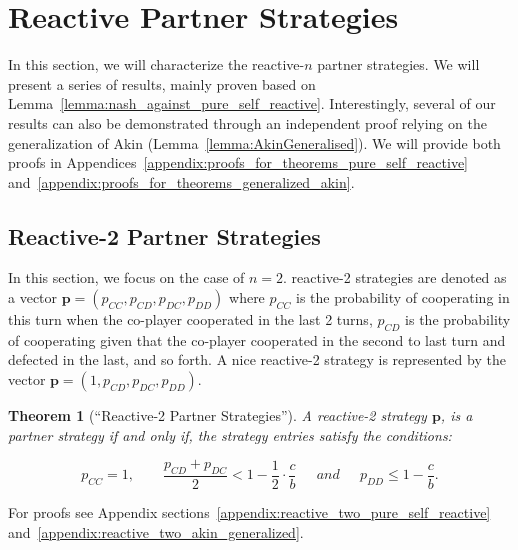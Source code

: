 \documentclass[11pt]{article}
\theoremstyle{plainCl1}
\newtheorem{theorem}{Theorem}
\theoremstyle{plainCl2}
\begin{document}

\section{Reactive Partner Strategies}\label{section:reactive_strategies}

In this section, we will characterize the reactive-$n$ partner strategies. We
will present a series of results, mainly proven based on
Lemma~\ref{lemma:nash_against_pure_self_reactive}. Interestingly, several of our
results can also be demonstrated through an independent proof relying on the
generalization of Akin (Lemma~\ref{lemma:AkinGeneralised}). We will provide both
proofs in Appendices~\ref{appendix:proofs_for_theorems_pure_self_reactive}
and~\ref{appendix:proofs_for_theorems_generalized_akin}.


\subsection{Reactive-2 Partner Strategies}\label{section:reactive_two_partner_strategies}

In this section, we focus on the case of $n=2$. reactive-2 strategies are denoted as a vector
$\mathbf{p}=(p_{CC}, p_{CD}, p_{DC}, p_{DD})$ where $p_{CC}$ is the
probability of cooperating in this turn when the co-player cooperated in the
last 2 turns, $p_{CD}$ is the probability of cooperating given that the
co-player cooperated in the second to last turn and defected in the last, and so
forth. A nice reactive-2 strategy is represented by the vector $\mathbf{p}=(1,
p_{CD}, p_{DC}, p_{DD})$.

\begin{theorem}[``Reactive-2 Partner Strategies'']\label{theorem:reactive_two_partner_strategies}
A reactive-2 strategy $\mathbf{p}$, is a partner strategy if and only if,
the strategy entries satisfy the conditions:

\begin{equation}\label{eq:two_bit_conditions}
  p_{CC} = 1, \qquad \displaystyle \frac{p_{CD} + p_{DC}}{2} < 1 - \frac{1}{2} \cdot \frac{c}{b} \quad ~~and~~ \quad \displaystyle p_{DD} \leq 1\!-\! \frac{c}{b}.
\end{equation}
\end{theorem}

For proofs see Appendix sections~\ref{appendix:reactive_two_pure_self_reactive}
and~\ref{appendix:reactive_two_akin_generalized}.
\end{document}

